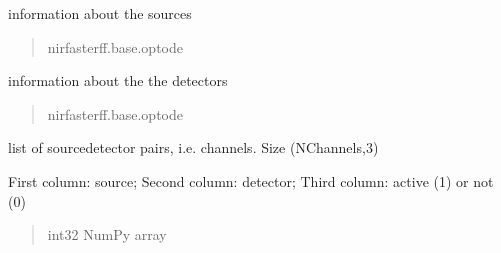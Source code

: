 \documentclass[letterpaper,10pt,english]{sphinxmanual}
\begin{document}
\begin{fulllineitems}
\begin{fulllineitems}
\label{\detokenize{_autosummary/nirfasterff.base.stnd_mesh.stndmesh:nirfasterff.base.stnd_mesh.stndmesh.source}}
\pysigstartsignatures
\pysigline
{}
\pysigstopsignatures
\sphinxAtStartPar
information about the sources
\begin{quote}\begin{description}
\sphinxAtStartPar
nirfasterff.base.optode

\end{description}\end{quote}

\end{fulllineitems}


\begin{fulllineitems}
\label{\detokenize{_autosummary/nirfasterff.base.stnd_mesh.stndmesh:nirfasterff.base.stnd_mesh.stndmesh.meas}}
\pysigstartsignatures
\pysigline
{}
\pysigstopsignatures
\sphinxAtStartPar
information about the the detectors
\begin{quote}\begin{description}
\sphinxAtStartPar
nirfasterff.base.optode

\end{description}\end{quote}

\end{fulllineitems}


\begin{fulllineitems}
\label{\detokenize{_autosummary/nirfasterff.base.stnd_mesh.stndmesh:nirfasterff.base.stnd_mesh.stndmesh.link}}
\pysigstartsignatures
\pysigline
{}
\pysigstopsignatures
\sphinxAtStartPar
list of source\sphinxhyphen{}detector pairs, i.e. channels. Size (NChannels,3)

\sphinxAtStartPar
First column: source; Second column: detector; Third column: active (1) or not (0)
\begin{quote}\begin{description}
\sphinxAtStartPar
int32 NumPy array


\end{description}
\end{quote}
\end{fulllineitems}
\end{fulllineitems}
\end{document}
